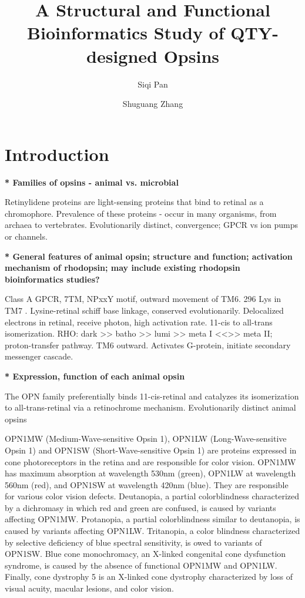 \documentclass[fleqn,10pt,lineno]{manuscript}
\title{A Structural and Functional Bioinformatics Study of QTY-designed Opsins}
\author[1]{Siqi Pan}
\author[2]{Shuguang Zhang}
\affil[1]{Shanghai World Foreign Language Academy, 400 Baihua Street, Shanghai 200233, China}
\affil[2]{Lab of Molecular Architecture, Media Lab, Massachusetts Institute of Technology, 77 Massachusetts Avenue, Cambridge, MA 02139, USA}
\begin{document}
\flushbottom
\maketitle
\thispagestyle{empty}

\section*{Introduction}

\textbf{* Families of opsins - animal vs. microbial}

\citep{Spudich_2000}

Retinylidene proteins are light-sensing proteins that bind to retinal as a chromophore. 
Prevalence of these proteins - occur in many organisms, from archaea to vertebrates. 
Evolutionarily distinct, convergence; GPCR vs ion pumps or channels. 

\textbf{* General features of animal opsin; structure and function; activation mechanism of rhodopsin; may include existing rhodopsin bioinformatics studies?}

Class A GPCR, 7TM, NPxxY motif, outward movement of TM6. \citep{Sakmar_2002, Zhou_2019}
296 Lys in TM7 \citep{Guhmann_2022}.
Lysine-retinal schiff base linkage, conserved evolutionarily. 
Delocalized electrons in retinal, receive photon, high activation rate. 
11-cis to all-trans isomerization.
RHO: dark >> batho >> lumi >> meta I <<>> meta II; proton-transfer pathway. 
TM6 outward. 
Activates G-protein, initiate secondary messenger cascade. 

\textbf{* Expression, function of each animal opsin}

The OPN family preferentially binds 11-cis-retinal and catalyzes its isomerization to all-trans-retinal via a retinochrome mechanism. 
Evolutionarily distinct animal opsins \citep{Terakita_2005, Shichida_2009}

OPN1MW (Medium-Wave-sensitive Opsin 1), OPN1LW (Long-Wave-sensitive Opsin 1) and OPN1SW (Short-Wave-sensitive Opsin 1) are proteins expressed in cone photoreceptors in the retina and are responsible for color vision. OPN1MW has maximum absorption at wavelength 530nm (green), OPN1LW at wavelength 560nm (red), and OPN1SW at wavelength 420nm (blue). They are responsible for various color vision defects. Deutanopia, a partial colorblindness characterized by a dichromasy in which red and green are confused, is caused by variants affecting OPN1MW. Protanopia, a partial colorblindness similar to deutanopia, is caused by variants affecting OPN1LW. Tritanopia, a color blindness characterized by selective deficiency of blue spectral sensitivity, is owed to variants of OPN1SW. Blue cone monochromacy, an X-linked congenital cone dysfunction syndrome, is caused by the absence of functional OPN1MW and OPN1LW. Finally, cone dystrophy 5 is an X-linked cone dystrophy characterized by loss of visual acuity, macular lesions, and color vision. 
\end{document}
